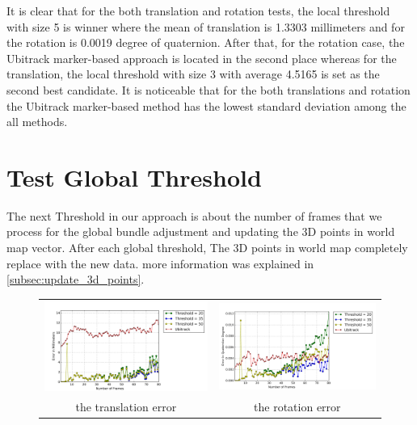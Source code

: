 It is clear that for the both translation and rotation tests, the local threshold with size 5 is winner where the mean of translation is 1.3303 millimeters and for the rotation is 0.0019 degree of quaternion. After that, for the rotation case, the Ubitrack marker-based approach is located in the second place whereas for the translation, the local threshold with size 3 with average 4.5165 is set as the second best candidate. It is noticeable that for the both translations and rotation the Ubitrack marker-based method has the lowest standard deviation among the all methods.

\section{Test Global Threshold}
The next Threshold in our approach is about the number of frames that we process for the global bundle adjustment and updating the 3D points in world map vector. After each global threshold, The 3D points in world map completely replace with the new data. more information was explained in \autoref{subsec:update_3d_points}.
\begin{figure}[H]
\centering
\begin{tabular}{cc}
  \includegraphics[width=80mm]{figures/global/graph_translation} &   \includegraphics[width=80mm]{figures/global/graph_rotation}  \\
  the translation error & the rotation error \\[6pt]
\end{tabular}
\caption{}\label{fig:test_global_threshold}

\end{figure}

